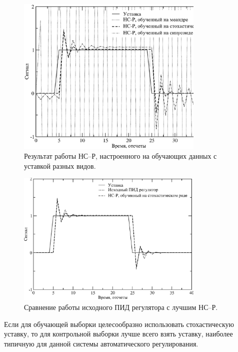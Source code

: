 \begin{figure}
\centering
\includegraphics[width=0.8\textwidth,%
  totalheight=0.35\textheight]{nnc_system_response_rus}
\caption{Результат работы НС--Р, настроенного на обучающих данных с уставкой
         разных видов.}\label{fig:nnc_system_response}
\end{figure}

\begin{figure}
\centering
\includegraphics[width=0.8\textwidth,%
  totalheight=0.35\textheight]{nnc_pid_system_responses_rus}
\caption{Сравнение работы исходного ПИД регулятора с лучшим НС--Р.}%
\label{fig:nnc_pid_system_responses}
\end{figure}

Если для обучающей выборки целесообразно использовать стохастическую
уставку, то для контрольной выборки лучше всего взять уставку,
наиболее типичную для данной системы автоматического регулирования.


